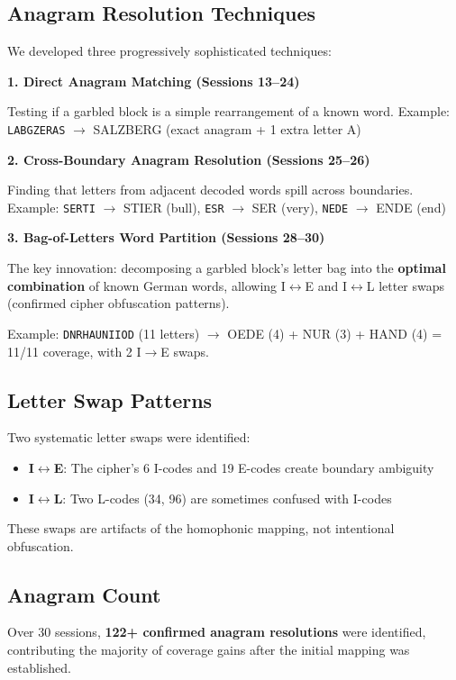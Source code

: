 \documentclass[11pt,a4paper]{article}
\begin{document}
\subsection{Anagram Resolution Techniques}

We developed three progressively sophisticated techniques:

\textbf{1. Direct Anagram Matching (Sessions 13--24)}

Testing if a garbled block is a simple rearrangement of a known word.
Example: \texttt{LABGZERAS} $\rightarrow$ SALZBERG (exact anagram + 1 extra letter A)

\textbf{2. Cross-Boundary Anagram Resolution (Sessions 25--26)}

Finding that letters from adjacent decoded words spill across boundaries.
Example: \texttt{SERTI} $\rightarrow$ STIER (bull), \texttt{ESR} $\rightarrow$ SER (very), \texttt{NEDE} $\rightarrow$ ENDE (end)

\textbf{3. Bag-of-Letters Word Partition (Sessions 28--30)}

The key innovation: decomposing a garbled block's letter bag into the \textbf{optimal combination} of known German words, allowing I$\leftrightarrow$E and I$\leftrightarrow$L letter swaps (confirmed cipher obfuscation patterns).

Example: \texttt{DNRHAUNIIOD} (11 letters) $\rightarrow$ OEDE (4) + NUR (3) + HAND (4) = 11/11 coverage, with 2 I$\rightarrow$E swaps.

\subsection{Letter Swap Patterns}

Two systematic letter swaps were identified:
\begin{itemize}
\item \textbf{I$\leftrightarrow$E}: The cipher's 6 I-codes and 19 E-codes create boundary ambiguity
\item \textbf{I$\leftrightarrow$L}: Two L-codes (34, 96) are sometimes confused with I-codes
\end{itemize}

These swaps are artifacts of the homophonic mapping, not intentional obfuscation.

\subsection{Anagram Count}

Over 30 sessions, \textbf{122+ confirmed anagram resolutions} were identified, contributing the majority of coverage gains after the initial mapping was established.
\end{document}
